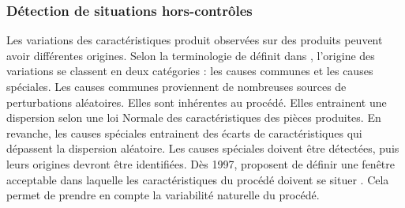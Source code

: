 \subsubsection{Détection de situations hors-contrôles} \label{subsubsec:spc}
Les variations des caractéristiques produit observées sur des produits peuvent avoir différentes origines.
Selon la terminologie de \citeauthor{shewhart_economic_1930} définit dans  \cite{shewhart_economic_1930}, l'origine des variations se classent en deux catégories : les causes communes et les causes spéciales.
Les causes communes proviennent de nombreuses sources de perturbations aléatoires.
Elles sont inhérentes au procédé.
Elles entrainent une dispersion selon une loi Normale des caractéristiques des pièces produites.
En revanche, les causes spéciales entrainent des écarts de caractéristiques qui dépassent la dispersion aléatoire.
Les causes spéciales doivent être détectées, puis leurs origines devront être identifiées.
Dès 1997, \citeauthor{sherbelis_methods_1997} proposent de définir une fenêtre acceptable dans laquelle les caractéristiques du procédé doivent se situer \cite{sherbelis_methods_1997}.
Cela permet de prendre en compte la variabilité naturelle du procédé.

